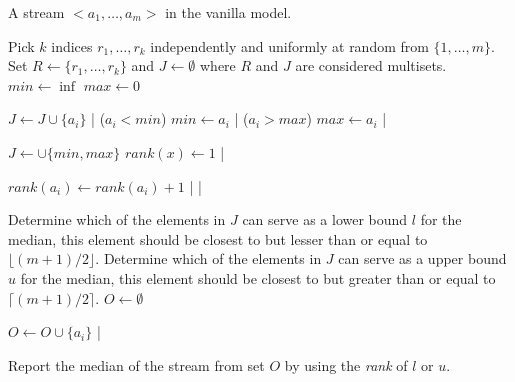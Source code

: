 \begin{sourcecode}
A stream $<a_1, \ldots , a_m>$ in the vanilla model.
\silend

Pick $k$ indices $r_1, \ldots , r_k$ independently and uniformly at random from $\{1, \ldots , m\}$.
Set $R \leftarrow \{r_1, \ldots , r_k\}$ and $J \leftarrow \emptyset$ where $R$ and $J$ are considered multisets.
$\textit{min} \leftarrow \inf$
$\textit{max} \leftarrow 0$
\silend

	$J \leftarrow J \cup \{a_i\}$
|
\qif($a_i < \textit{min}$)
	$\textit{min} \leftarrow a_i$
|
\qif($a_i > \textit{max}$)
	$\textit{max} \leftarrow a_i$
|
\silend

$J \leftarrow \cup \{min, max\}$
	$\textit{rank}(x) \leftarrow 1$
|
\silend

		$\textit{rank}(a_i) \leftarrow \textit{rank}(a_i) + 1$
	|
|
\silend

Determine which of the elements in $J$ can serve as a lower bound $l$ for the median, this element should be closest to but lesser than or equal to $\lfloor (m+1)/2 \rfloor$.
Determine which of the elements in $J$ can serve as a upper bound $u$ for the median, this element should be closest to but greater than or equal to $\lceil (m+1)/2 \rceil$.
$O \leftarrow \emptyset$
\silend

	$O \leftarrow O \cup \{a_i\}$
|
\silend

Report the median of the stream from set $O$ by using the \textit{rank} of $l$ or $u$.
\qend
\end{sourcecode}